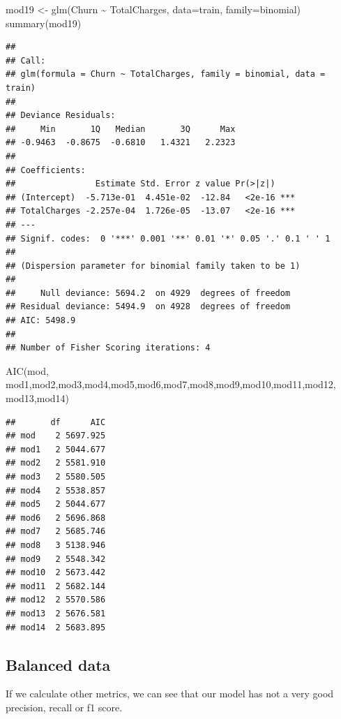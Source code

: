 \documentclass[
  twoside]{article}
\newenvironment{Shaded}{\begin{snugshade}}{\end{snugshade}}
\newcommand{\AttributeTok}[1]{\textcolor[rgb]{0.77,0.63,0.00}{#1}}
\newcommand{\FunctionTok}[1]{\textcolor[rgb]{0.00,0.00,0.00}{#1}}
\newcommand{\NormalTok}[1]{#1}
\newcommand{\OtherTok}[1]{\textcolor[rgb]{0.56,0.35,0.01}{#1}}
\newcommand{\SpecialCharTok}[1]{\textcolor[rgb]{0.00,0.00,0.00}{#1}}
\begin{document}
\begin{Shaded}
\begin{Highlighting}[]
\NormalTok{mod19 }\OtherTok{\textless{}{-}} \FunctionTok{glm}\NormalTok{(Churn }\SpecialCharTok{\textasciitilde{}}\NormalTok{ TotalCharges, }\AttributeTok{data=}\NormalTok{train, }\AttributeTok{family=}\NormalTok{binomial)}
\FunctionTok{summary}\NormalTok{(mod19)}
\end{Highlighting}
\end{Shaded}

\begin{verbatim}
## 
## Call:
## glm(formula = Churn ~ TotalCharges, family = binomial, data = train)
## 
## Deviance Residuals: 
##     Min       1Q   Median       3Q      Max  
## -0.9463  -0.8675  -0.6810   1.4321   2.2323  
## 
## Coefficients:
##                Estimate Std. Error z value Pr(>|z|)    
## (Intercept)  -5.713e-01  4.451e-02  -12.84   <2e-16 ***
## TotalCharges -2.257e-04  1.726e-05  -13.07   <2e-16 ***
## ---
## Signif. codes:  0 '***' 0.001 '**' 0.01 '*' 0.05 '.' 0.1 ' ' 1
## 
## (Dispersion parameter for binomial family taken to be 1)
## 
##     Null deviance: 5694.2  on 4929  degrees of freedom
## Residual deviance: 5494.9  on 4928  degrees of freedom
## AIC: 5498.9
## 
## Number of Fisher Scoring iterations: 4
\end{verbatim}

\begin{Shaded}
\begin{Highlighting}[]
\FunctionTok{AIC}\NormalTok{(mod, mod1,mod2,mod3,mod4,mod5,mod6,mod7,mod8,mod9,mod10,mod11,mod12, mod13,mod14)}
\end{Highlighting}
\end{Shaded}

\begin{verbatim}
##       df      AIC
## mod    2 5697.925
## mod1   2 5044.677
## mod2   2 5581.910
## mod3   2 5580.505
## mod4   2 5538.857
## mod5   2 5044.677
## mod6   2 5696.868
## mod7   2 5685.746
## mod8   3 5138.946
## mod9   2 5548.342
## mod10  2 5673.442
## mod11  2 5682.144
## mod12  2 5570.586
## mod13  2 5676.581
## mod14  2 5683.895
\end{verbatim}

\hypertarget{balanced-data}{%
\subsection{Balanced data}\label{balanced-data}}

If we calculate other metrics, we can see that our model has not a very
good precision, recall or f1 score.
\end{document}
